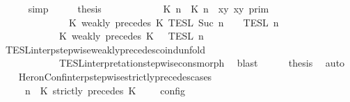 \begin{isabellebody}
\ \ \ \ \isamarkupfalse%
\ simp\isanewline
\ \ \isamarkupfalse%
\ \isamarkupfalse%
\ {\isacharquery}thesis\isanewline
\ \ \isamarkupfalse%
\ {\isacharminus}\isanewline
\ \ \ \ \isamarkupfalse%
\ {\isacartoucheopen}{\isasymlbrakk}\ {\isasymlceil}{\isacharhash}\isactrlsup {\isasymle}\ K\ n{\isacharcomma}\ {\isacharhash}\isactrlsup {\isasymle}\ K\ n{\isasymrceil}\ {\isasymin}\ {\isacharparenleft}{\isasymlambda}{\isacharparenleft}x{\isacharcomma}y{\isacharparenright}{\isachardot}\ x{\isasymle}y{\isacharparenright}\ {\isasymrbrakk}\isactrlsub p\isactrlsub r\isactrlsub i\isactrlsub m\isanewline
\ \ \ \ \ \ \ \ \ \ \ \ {\isasyminter}\ {\isasymlbrakk}\ K\ weakly\ precedes\ K\ {\isasymrbrakk}\isactrlsub T\isactrlsub E\isactrlsub S\isactrlsub L\isactrlbsup {\isasymge}\ Suc\ n\isactrlesup \ {\isasyminter}\ {\isasymlbrakk}{\isasymlbrakk}\ {\isasymPsi}\ {\isasymrbrakk}{\isasymrbrakk}\isactrlsub T\isactrlsub E\isactrlsub S\isactrlsub L\isactrlbsup {\isasymge}\ n\isactrlesup \isanewline
\ \ \ \ \ \ \ \ \ \ {\isacharequal}\ {\isasymlbrakk}{\isasymlbrakk}\ {\isacharparenleft}K\ weakly\ precedes\ K\ {\isacharhash}\ {\isasymPsi}\ {\isasymrbrakk}{\isasymrbrakk}\isactrlsub T\isactrlsub E\isactrlsub S\isactrlsub L\isactrlbsup {\isasymge}\ n\isactrlesup {\isacartoucheclose}\isanewline
\ \ \ \ \ \ \isamarkupfalse%
\ TESL{\isacharunderscore}interp{\isacharunderscore}stepwise{\isacharunderscore}weakly{\isacharunderscore}precedes{\isacharunderscore}coind{\isacharunderscore}unfold\isanewline
\ \ \ \ \ \ \ \ \ \ \ \ TESL{\isacharunderscore}interpretation{\isacharunderscore}stepwise{\isacharunderscore}cons{\isacharunderscore}morph\ \isamarkupfalse%
\ blast\isanewline
\ \ \ \ \isamarkupfalse%
\ {\isacharquery}thesis\ \isamarkupfalse%
\ auto\isanewline
\ \ \isamarkupfalse%
\isanewline
{}\isamarkupfalse%
%
\endisatagproof
{\isafoldproof}%
%
\isadelimproof
\isanewline
%
\endisadelimproof
\isanewline
{}\isamarkupfalse%
\ HeronConf{\isacharunderscore}interp{\isacharunderscore}stepwise{\isacharunderscore}strictly{\isacharunderscore}precedes{\isacharunderscore}cases{\isacharcolon}\isanewline
\ \ \ {\isacartoucheopen}{\isasymlbrakk}\ {\isasymGamma}{\isacharcomma}\ n\ {\isasymturnstile}\ {\isacharparenleft}{\isacharparenleft}K\ strictly\ precedes\ K\ {\isacharhash}\ {\isasymPsi}{\isacharparenright}\ {\isasymtriangleright}\ {\isasymPhi}\ {\isasymrbrakk}\isactrlsub c\isactrlsub o\isactrlsub n\isactrlsub f\isactrlsub i\isactrlsub g\isanewline

\end{isabellebody}
